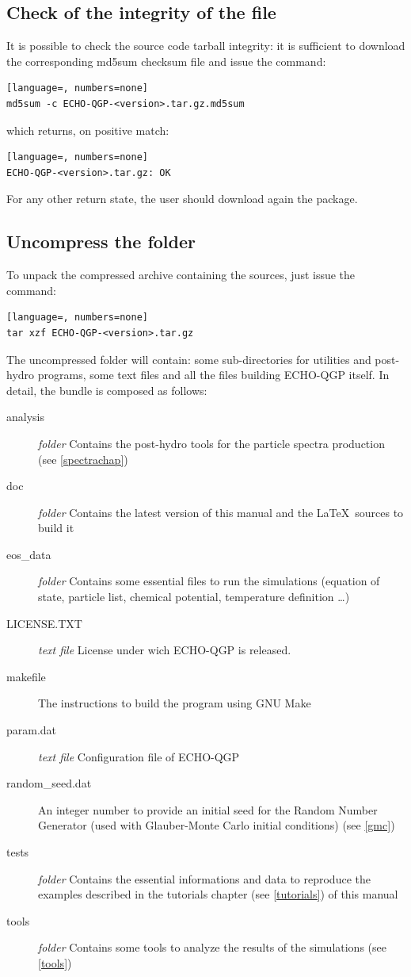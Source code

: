 \subsection{Check of the integrity of the file}
It is possible to check the source code tarball integrity: it is sufficient to download the corresponding md5sum checksum file and issue the command:
\begin{lstlisting}[language=, numbers=none]
md5sum -c ECHO-QGP-<version>.tar.gz.md5sum
\end{lstlisting}
which returns, on positive match:
\begin{lstlisting}[language=, numbers=none]
ECHO-QGP-<version>.tar.gz: OK
\end{lstlisting}
For any other return state, the user should download again the package.\\

\subsection{Uncompress the folder}
To unpack the compressed archive containing the sources, just issue the command:
\begin{lstlisting}[language=, numbers=none]
tar xzf ECHO-QGP-<version>.tar.gz
\end{lstlisting}
The uncompressed folder will contain: some sub-directories for utilities and post-hydro programs, 
some text files and all the files building ECHO-QGP itself. In detail, the bundle is composed as follows: 
\begin{description}
 \item[analysis] \textit{folder} Contains the post-hydro tools for the particle spectra production (see \ref{spectrachap})
 \item[doc] \textit{folder} Contains the latest version of this manual and the \LaTeX$\,$ sources to build it
 \item[eos\_data] \textit{folder} Contains some essential files to run the simulations (equation of state, particle list, chemical potential, temperature definition \dots)
 \item[LICENSE.TXT] \textit{text file} License under wich ECHO-QGP is released.
 \item[makefile] The instructions to build the program using GNU Make
 \item[param.dat] \textit{text file} Configuration file of ECHO-QGP
 \item[random\_seed.dat] An integer number to provide an initial seed for the Random Number Generator (used with Glauber-Monte Carlo initial conditions) (see \ref{gmc})
 \item[tests] \textit{folder} Contains the essential informations and data to reproduce the examples described in the tutorials chapter (see \ref{tutorials}) of this manual
 \item[tools] \textit{folder} Contains some tools to analyze the results of the simulations (see \ref{tools})
 \end{description}
 
